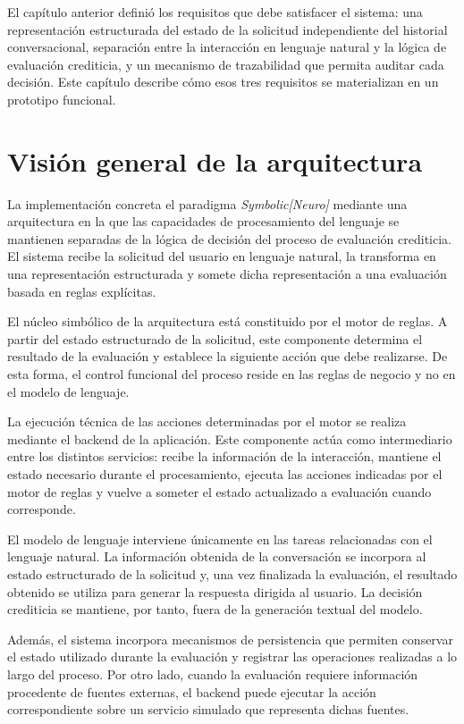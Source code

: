 \documentclass[12pt,a4paper]{report}
\begin{document}
El capítulo anterior definió los requisitos que debe satisfacer el sistema: una representación estructurada del estado de la solicitud independiente del historial conversacional, separación entre la interacción en lenguaje natural y la lógica de evaluación crediticia, y un mecanismo de trazabilidad que permita auditar cada decisión. Este capítulo describe cómo esos tres requisitos se materializan en un prototipo funcional.

\section{Visión general de la arquitectura}

La implementación concreta el paradigma \textit{Symbolic[Neuro]} mediante una arquitectura en la que las capacidades de procesamiento del lenguaje se mantienen separadas de la lógica de decisión del proceso de evaluación crediticia. El sistema recibe la solicitud del usuario en lenguaje natural, la transforma en una representación estructurada y somete dicha representación a una evaluación basada en reglas explícitas.

El núcleo simbólico de la arquitectura está constituido por el motor de reglas. A partir del estado estructurado de la solicitud, este componente determina el resultado de la evaluación y establece la siguiente acción que debe realizarse. De esta forma, el control funcional del proceso reside en las reglas de negocio y no en el modelo de lenguaje.

La ejecución técnica de las acciones determinadas por el motor se realiza mediante el backend de la aplicación. Este componente actúa como intermediario entre los distintos servicios: recibe la información de la interacción, mantiene el estado necesario durante el procesamiento, ejecuta las acciones indicadas por el motor de reglas y vuelve a someter el estado actualizado a evaluación cuando corresponde.

El modelo de lenguaje interviene únicamente en las tareas relacionadas con el lenguaje natural. La información obtenida de la conversación se incorpora al estado estructurado de la solicitud y, una vez finalizada la evaluación, el resultado obtenido se utiliza para generar la respuesta dirigida al usuario. La decisión crediticia se mantiene, por tanto, fuera de la generación textual del modelo.

Además, el sistema incorpora mecanismos de persistencia que permiten conservar el estado utilizado durante la evaluación y registrar las operaciones realizadas a lo largo del proceso. Por otro lado, cuando la evaluación requiere información procedente de fuentes externas, el backend puede ejecutar la acción correspondiente sobre un servicio simulado que representa dichas fuentes.
\end{document}
